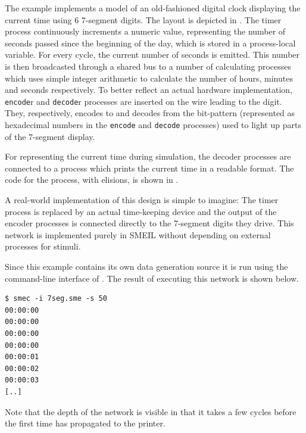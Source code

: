   The example implements a model of an old-fashioned digital clock displaying
  the current time using 6 7-segment digits. The layout is depicted in
  . The timer process continuously increments a numeric value,
  representing the number of seconds passed since the beginning of the day,
  which is stored in a process-local variable. For every cycle, the current
  number of seconds is emitted. This number is then broadcasted through a shared
  bus to a number of calculating processes which uses simple integer arithmetic
  to calculate the number of hours, minutes and seconds respectively. To better
  reflect an actual hardware implementation, {\tt encode}r and {\tt decode}r
  processes are inserted on the wire leading to the digit. They, respectively,
  encodes to and decodes from the bit-pattern (represented as hexadecimal
  numbers in the {\tt encode} and {\tt decode} processes) used to light up parts
  of the 7-segment display.

  For representing the current time during simulation, the decoder processes are
  connected to a process which prints the current time in a readable format. The
  code for the process, with elisions, is shown in .

  A real-world implementation of this design is simple to imagine: The timer
  process is replaced by an actual time-keeping device and the output of the
  encoder processes is connected directly to the 7-segment digits they
  drive. This network is implemented purely in SMEIL without depending on
  external processes for stimuli.

  Since this example contains its own data generation source it is run using the
  command-line interface of \libsme{}. The result of executing this network is
  shown below.
\begin{verbatim}
$ smec -i 7seg.sme -s 50  
00:00:00
00:00:00
00:00:00
00:00:00
00:00:01
00:00:02
00:00:03
[..]
\end{verbatim}
  Note that the depth of the network is visible in that it takes a few cycles
  before the first time has propagated to the printer.
  
